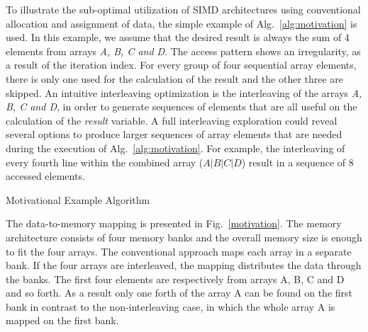 \documentclass[prodmode,acmtodaes]{acmsmall}
\begin{document}
To illustrate the sub-optimal utilization of SIMD architectures using conventional allocation and assignment of data, the simple example of Alg.~\ref{alg:motivation} is used.
In this example, we assume that the desired result is always the sum of 4 elements from arrays \textit{A, B, C and D}. 
The access pattern shows an irregularity, as a result of the iteration index.
For every group of four sequential array elements, there is only one used for the calculation of the result and the other three are skipped.
An intuitive interleaving optimization is the interleaving of the arrays \textit{A, B, C and D}, in order to generate sequences of elements that are all useful on the calculation of the \textit{result} variable. 
A full interleaving exploration could reveal several options to produce larger sequences of array elements that are needed during the execution of Alg.~\ref{alg:motivation}.
For example, the interleaving of every fourth line within the combined array ($A\vert B\vert C\vert D$) result in a sequence of 8 accessed elements.

\begin{algorithm}[t]
\SetAlgoNoLine
{}
\caption{Motivational Example Algorithm}
\label{alg:motivation}
\end{algorithm}

The data-to-memory mapping is presented in Fig.~\ref{motivation}. 
The memory architecture consists of four memory banks and the overall memory size is enough to fit the four arrays.
The conventional approach maps each array in a separate bank.
If the four arrays are interleaved, the mapping distributes the data through the banks.
The first four elements are respectively from arrays A, B, C and D and so forth.
As a result only one forth of the array A can be found on the first bank in contrast to the non-interleaving case, in which the whole array A is mapped on the first bank.
\end{document}
